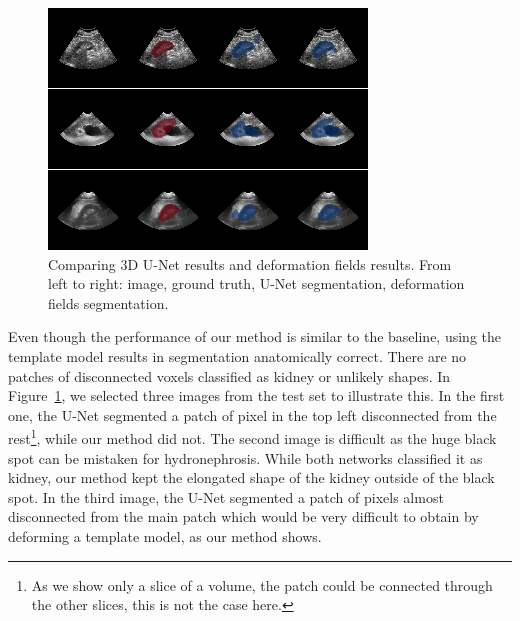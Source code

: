 \begin{figure}[htbp]
    \centering
	\includegraphics[width=\textwidth]{img_seg/unet_vs_deform}
    \caption{Comparing 3D U-Net results and deformation fields results. From left to right: image, ground truth, U-Net segmentation, deformation fields segmentation.}
    \label{fig:unet_vs_deform}
\end{figure}

Even though the performance of our method is similar to the baseline, using the template model results in segmentation anatomically correct. There are no patches of disconnected voxels classified as kidney or unlikely shapes. In Figure~\ref{fig:unet_vs_deform}, we selected three images from the test set to illustrate this. In the first one, the U-Net segmented a patch of pixel in the top left disconnected from the rest\footnote{As we show only a slice of a volume, the patch could be connected through the other slices, this is not the case here.}, while our method did not. The second image is difficult as the huge black spot can be mistaken for hydronephrosis. While both networks classified it as kidney, our method kept the elongated shape of the kidney outside of the black spot. In the third image, the U-Net segmented a patch of pixels almost disconnected from the main patch which would be very difficult to obtain by deforming a template model, as our method shows. 

